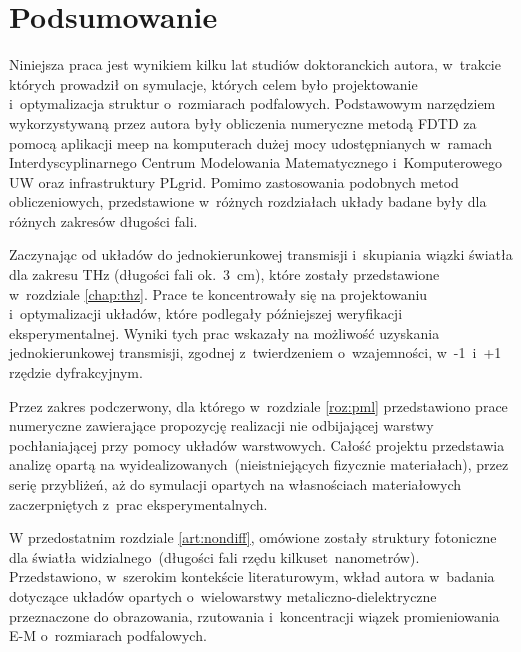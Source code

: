 \chapter{Podsumowanie}
Niniejsza praca jest wynikiem kilku lat studiów doktoranckich autora, w~trakcie których prowadził on symulacje, których celem było projektowanie i~optymalizacja struktur o~rozmiarach podfalowych. Podstawowym narzędziem wykorzystywaną przez autora były obliczenia numeryczne metodą FDTD za pomocą aplikacji meep\cite{OskooiRo10} na komputerach dużej mocy udostępnianych w~ramach Interdyscyplinarnego Centrum Modelowania Matematycznego i~Komputerowego UW oraz infrastruktury PLgrid. Pomimo zastosowania podobnych metod obliczeniowych, przedstawione w~różnych rozdziałach układy badane były dla różnych zakresów długości fali.

Zaczynając od układów do jednokierunkowej transmisji i~skupiania wiązki światła dla zakresu THz (długości fali ok.~3~cm), które zostały przedstawione w~rozdziale \ref{chap:thz}. Prace te koncentrowały się na projektowaniu i~optymalizacji układów, które podlegały późniejszej weryfikacji eksperymentalnej. Wyniki tych prac wskazały na możliwość uzyskania jednokierunkowej transmisji, zgodnej z~twierdzeniem o~wzajemności, w~-1~i~+1 rzędzie dyfrakcyjnym.

Przez zakres podczerwony, dla którego w~rozdziale \ref{roz:pml} przedstawiono prace numeryczne zawierające propozycję realizacji nie odbijającej warstwy pochłaniającej przy pomocy układów warstwowych. Całość projektu przedstawia analizę opartą na wyidealizowanych~(nieistniejących fizycznie materiałach), przez serię przybliżeń, aż do symulacji opartych na własnościach materiałowych zaczerpniętych z~prac eksperymentalnych.

W przedostatnim  rozdziale \ref{art:nondiff},  omówione zostały struktury fotoniczne dla światła widzialnego~(długości fali rzędu kilkuset~nanometrów). Przedstawiono, w~szerokim kontekście literaturowym, wkład autora w~badania dotyczące układów opartych o~wielowarstwy metaliczno-dielektryczne przeznaczone do obrazowania, rzutowania i~koncentracji wiązek promieniowania E-M o~rozmiarach podfalowych.

